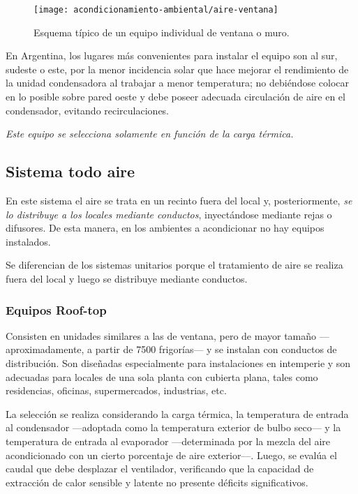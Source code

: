 \begin{figure}[h]
	\centering
	\caption{Esquema típico de un equipo individual de ventana o muro.}
	\label{fig:aire-ventana}
	\texttt{[image: acondicionamiento-ambiental/aire-ventana]}
\end{figure}

En Argentina, los lugares más convenientes para instalar el equipo son al sur, sudeste o este, por la menor incidencia solar que hace mejorar el rendimiento de la unidad condensadora al trabajar a menor temperatura; no debiéndose colocar en lo posible sobre pared oeste y debe poseer adecuada circulación de aire en el condensador, evitando recirculaciones.

\emph{Este equipo se selecciona solamente en función de la carga térmica.}

\subsection{Sistema todo aire}

En este sistema el aire se trata en un recinto fuera del local y, posteriormente, \emph{se lo distribuye a los locales mediante conductos}, inyectándose mediante rejas o difusores. De esta manera, en los ambientes a acondicionar no hay equipos instalados.

Se diferencian de los sistemas unitarios porque el tratamiento de aire se realiza fuera del local y luego se distribuye mediante conductos.

\subsubsection{Equipos Roof-top}

Consisten en unidades similares a las de ventana, pero de mayor tamaño —aproximadamente, a partir de 7500 frigorías— y se instalan con conductos de distribución. Son diseñadas especialmente para instalaciones en intemperie y son adecuadas para locales de una sola planta con cubierta plana, tales como residencias, oficinas, supermercados, industrias, etc.

La selección se realiza considerando la carga térmica, la temperatura de entrada al condensador —adoptada como la temperatura exterior de bulbo seco— y la temperatura de entrada al evaporador —determinada por la mezcla del aire acondicionado con un cierto porcentaje de aire exterior—. Luego, se evalúa el caudal que debe desplazar el ventilador, verificando que la capacidad de extracción de calor sensible y latente no presente déficits significativos.

